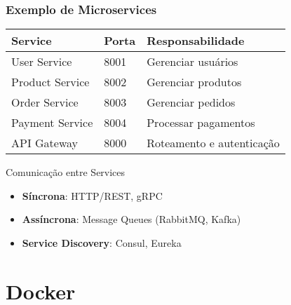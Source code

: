 \documentclass[aspectratio=169]{beamer}
\begin{document}
\begin{frame}
    \frametitle{Exemplo de Microservices}
    \begin{center}
        \begin{tabular}{|l|l|l|}
            \hline
            \textbf{Service} & \textbf{Porta} & \textbf{Responsabilidade} \\
            \hline
            User Service & 8001 & Gerenciar usuários \\
            \hline
            Product Service & 8002 & Gerenciar produtos \\
            \hline
            Order Service & 8003 & Gerenciar pedidos \\
            \hline
            Payment Service & 8004 & Processar pagamentos \\
            \hline
            API Gateway & 8000 & Roteamento e autenticação \\
            \hline
        \end{tabular}
    \end{center}
    
    \vspace{1em}
    \begin{exampleblock}{Comunicação entre Services}
        \begin{itemize}
            \item \textbf{Síncrona}: HTTP/REST, gRPC
            \item \textbf{Assíncrona}: Message Queues (RabbitMQ, Kafka)
            \item \textbf{Service Discovery}: Consul, Eureka
        \end{itemize}
    \end{exampleblock}
\end{frame}

\section{Docker}
\end{document}
